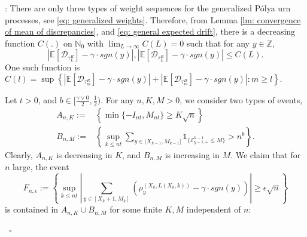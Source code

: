 \documentclass[twoside,12pt,a4paper]{article}
\numberwithin{equation}{section}
\newenvironment{proof}[1][Proof]{{\sc #1}:}{~\hfill $\square$}
\newcommand{\abs}[1]{\left\vert #1 \right\vert}
\begin{document}
	\begin{proof} There are only three types of weight sequences for the generalized P\'{o}lya urn processes, see \eqref{eq: generalized weights}. Therefore, from Lemma \ref{lm: convergence of mean of discrepancies}, and 
		\eqref{eq: general expected drift}, there is a decreasing function $C(.)$ on $\mathbb{N}_0$ with $\lim_{L\to \infty}C(L) =0$ such that for any $y \in \mathbb{Z}$,
		\begin{equation}\label{eq: uniform convergence}
			\abs{\mathbb{E}\left[ \mathcal{D}_{\tau_L^R} \right] - \gamma \cdot sgn(y)}, \abs{\mathbb{E}\left[ \mathcal{D}_{\tau_L^B} \right] - \gamma \cdot sgn(y)} \leq C(L).
		\end{equation} One such function is $C(l) = \sup \left\{  \abs{\mathbb{E}\left[ \mathcal{D}_{\tau_m^R} \right] - \gamma \cdot sgn(y)} + \abs{\mathbb{E}\left[ \mathcal{D}_{\tau_m^B} \right] - \gamma \cdot sgn(y)} : m\geq l \right\}.     $  
		
		
		Let $t>0$, and $b \in [\frac{\gamma \vee 0 }{2},\frac{1}{2})$.  For any $n,K,M>0$, we consider two types of events, 
		\begin{align*}
			A_{n,K}:=&\left\{ \min\{-I_{nt}, M_{nt}\} \geq K \sqrt{n}  \right\}
			\\
			B_{n,M}:=& \left\{  \sup_{k\leq n t} \sum_{ y\in (X_{k-1}, M_{k-1}]}  \mathbb{1}_{\{ \mathcal{E}^{k-1}_{y-1,+} \leq M  \}} >n^b  \right\}.
		\end{align*}
		Clearly, $A_{n,K}$ is decreasing in $K$, and $B_{n,M}$ is increasing in $M$. We claim that for $n$ large, the event 
		$$
		F_{n,\epsilon}:= \left\{ \sup_{k\leq n t}  \abs{  	\sum_{y\in [X_{k}+1 ,M_k]} \left( \rho^{(X_k,L(X_k,k))}_y -  \gamma \cdot sgn(y) \right) } \geq  \epsilon \sqrt{n}    \right \}$$ is contained in $A_{n,K} \cup B_{n,M} $ for some finite $K, M$ independent of $n$:   
		

\end{proof}
\end{document}

